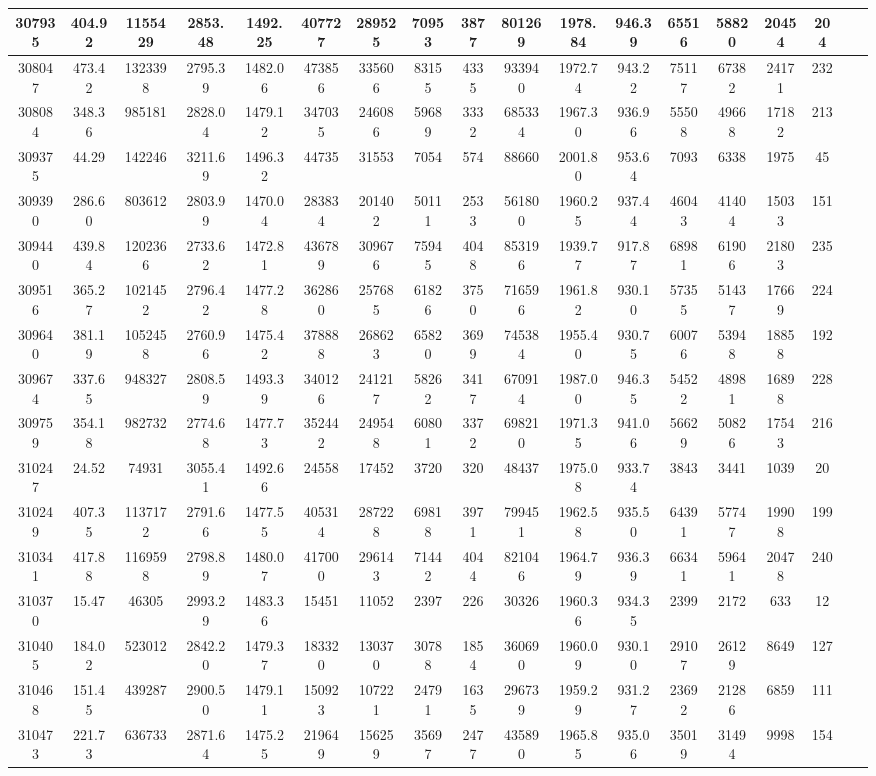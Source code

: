 \documentclass[10pt]{extarticle}
\begin{document}
\begin{longtable}{|c|c|c|c|c|c|c|c|c|c|c|c|c|c|c|c|c|c|}
\hline 
307935&404.92&1155429&2853.48&1492.25&407727&289525&70953&3877&801269&1978.84&946.39&65516&58820&20454&204 \\ 
\hline 
308047&473.42&1323398&2795.39&1482.06&473856&335606&83155&4335&933940&1972.74&943.22&75117&67382&24171&232 \\ 
\hline 
308084&348.36&985181&2828.04&1479.12&347035&246086&59689&3332&685334&1967.30&936.96&55508&49668&17182&213 \\ 
\hline 
309375&44.29&142246&3211.69&1496.32&44735&31553&7054&574&88660&2001.80&953.64&7093&6338&1975&45 \\ 
\hline 
309390&286.60&803612&2803.99&1470.04&283834&201402&50111&2533&561800&1960.25&937.44&46043&41404&15033&151 \\ 
\hline 
309440&439.84&1202366&2733.62&1472.81&436789&309676&75945&4048&853196&1939.77&917.87&68981&61906&21803&235 \\ 
\hline 
309516&365.27&1021452&2796.42&1477.28&362860&257685&61826&3750&716596&1961.82&930.10&57355&51437&17669&224 \\ 
\hline 
309640&381.19&1052458&2760.96&1475.42&378888&268623&65820&3699&745384&1955.40&930.75&60076&53948&18858&192 \\ 
\hline 
309674&337.65&948327&2808.59&1493.39&340126&241217&58262&3417&670914&1987.00&946.35&54522&48981&16898&228 \\ 
\hline 
309759&354.18&982732&2774.68&1477.73&352442&249548&60801&3372&698210&1971.35&941.06&56629&50826&17543&216 \\ 
\hline 
310247&24.52&74931&3055.41&1492.66&24558&17452&3720&320&48437&1975.08&933.74&3843&3441&1039&20 \\ 
\hline 
310249&407.35&1137172&2791.66&1477.55&405314&287228&69818&3971&799451&1962.58&935.50&64391&57747&19908&199 \\ 
\hline 
310341&417.88&1169598&2798.89&1480.07&417000&296143&71442&4044&821046&1964.79&936.39&66341&59641&20478&240 \\ 
\hline 
310370&15.47&46305&2993.29&1483.36&15451&11052&2397&226&30326&1960.36&934.35&2399&2172&633&12 \\ 
\hline 
310405&184.02&523012&2842.20&1479.37&183320&130370&30788&1854&360690&1960.09&930.10&29107&26129&8649&127 \\ 
\hline 
310468&151.45&439287&2900.50&1479.11&150923&107221&24791&1635&296739&1959.29&931.27&23692&21286&6859&111 \\ 
\hline 
310473&221.73&636733&2871.64&1475.25&219649&156259&35697&2477&435890&1965.85&935.06&35019&31494&9998&154 \\ 

\end{longtable}
\end{document}
